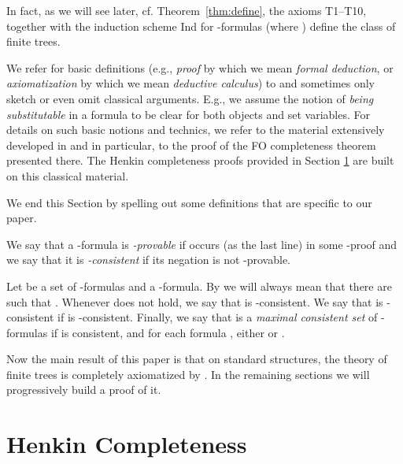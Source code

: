 \documentclass{LMCS}
\newcommand{\fo}{\textsf{FO}\xspace}
\begin{document}
In fact, as we will see later, cf. Theorem~\ref{thm:define}, the
axioms T1--T10, together with the induction scheme Ind for
-formulas (where ) define
the class of finite trees.

We refer for basic definitions (e.g., \emph{proof} by which we mean \emph{formal deduction}, or \emph{axiomatization} by which we mean \emph{deductive calculus}) to \cite{Enderton} and sometimes only sketch or even omit classical arguments. E.g., we assume the notion of \emph{being substitutable} in a formula
to be clear for both objects and set variables. For details on such
basic notions and technics, we refer to the material extensively
developed in \cite{Enderton} and in particular, to the proof of the \fo
completeness theorem presented there. The Henkin completeness proofs
provided in Section \ref{sec3} are built on this classical material. 

We end this Section by spelling out some definitions that are specific to our paper.

\begin{defi}
We say that a -formula  is \emph{-provable} if 
occurs (as the last line) in some -proof and we say that it is \emph{-consistent} if its negation is not -provable. 

Let  be a set of -formulas and  a
-formula. By  we will
always mean that there are  such
that . Whenever 
does not hold, we say that  is -consistent. We say that  is -consistent if  is -consistent.
Finally, we say that  is a \emph{maximal consistent set} of -formulas if 
 is consistent, and for each formula , either
 or .

\label{defax}
\end{defi}

Now the main result of this paper is that on standard structures,
the  theory of finite trees is completely axiomatized by
. In the remaining sections we will
progressively build a proof of it.





\section{Henkin Completeness}
\label{sec3}
\end{document}
